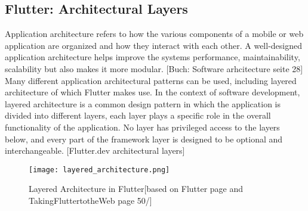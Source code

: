\subsection{Flutter: Architectural Layers}
Application architecture refers to how the various components of a mobile or web application are organized and how they interact with each other. A well-designed application architecture helps improve the systems performance, maintainability, scalability but also makes it more modular. [Buch: Software arhcitecture seite 28] Many different application architectural patterns can be used, including layered architecture of which Flutter makes use.  In the context of software development, layered architecture is a common design pattern in which the application is divided into different layers, each layer plays a specific role in the overall functionality of the application. No layer has privileged access to the layers below, and every part of the framework layer is designed to be optional and interchangeable. [Flutter.dev architectural layers] 
\begin{figure}[H]
	\centering
	\texttt{[image: layered\_architecture.png]}
	\caption[Layered Architecture in Flutter]{Layered Architecture in Flutter[based on Flutter page and TakingFluttertotheWeb page 50/]}
\end{figure}

